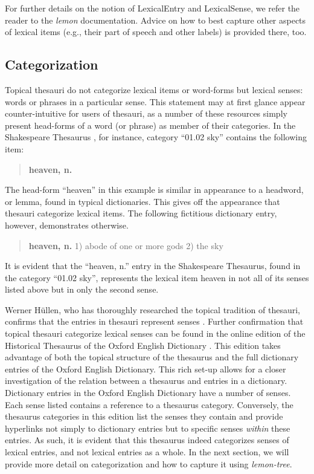 For further details on the notion of LexicalEntry and LexicalSense, we refer the reader to the \emph{lemon} documentation. Advice on how to best capture other aspects of lexical items (e.g., their part of speech and other labels) is provided there, too.

\subsection{Categorization}

Topical thesauri do not categorize lexical items or word-forms but lexical senses: words or phrases in a particular sense. 
This statement may at first glance appear counter-intuitive for users of thesauri, as a number of these resources simply present head-forms of a word (or phrase) as member of their categories. 
In the Shakespeare Thesaurus \cite{ref-ShT}, for instance, category “01.02 sky” contains the following item:
\begin{quotation}
	\textbf{heaven, n.}
\end{quotation}
The head-form “heaven” in this example is similar in appearance to a headword, or lemma, found in typical dictionaries. 
This gives off the appearance that thesauri categorize lexical items. The following fictitious dictionary entry, however, demonstrates otherwise.
\begin{quotation}
	\textbf{heaven, n.} 1) abode of one or more gods 2) the sky
\end{quotation}
It is evident that the “heaven, n.” entry in the Shakespeare Thesaurus, found in the category “01.02 sky”, represents the lexical item heaven in not all of its senses listed above but in only the second sense. 

Werner Hüllen, who has thoroughly researched the topical tradition of thesauri, confirms that the entries in thesauri represent senses \cite{hullen_history_2004}. 
Further confirmation that topical thesauri categorize lexical senses can be found in the online edition of the Historical Thesaurus of the Oxford English Dictionary \cite{ref-HTOED-Online}. 
This edition takes advantage of both the topical structure of the thesaurus and the full dictionary entries of the Oxford English Dictionary. 
This rich set-up allows for a closer investigation of the relation between a thesaurus and entries in a dictionary. 
Dictionary entries in the Oxford English Dictionary have a number of senses. 
Each sense listed contains a reference to a thesaurus category. 
Conversely, the thesaurus categories in this edition list the senses they contain and provide hyperlinks not simply to dictionary entries but to specific senses \emph{within} these entries. 
As such, it is evident that this thesaurus indeed categorizes senses of lexical entries, and not lexical entries as a whole. 
In the next section, we will provide more detail on categorization and how to capture it using \emph{lemon-tree}. 

